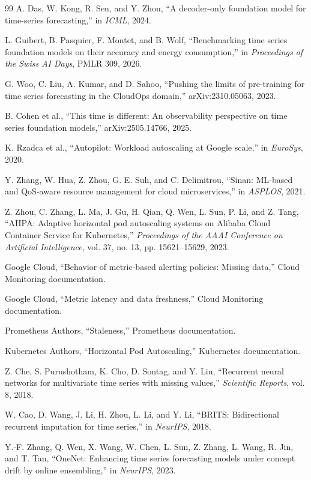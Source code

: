 \documentclass[conference]{IEEEtran}
\begin{document}
\begin{thebibliography}{99}
A. Das, W. Kong, R. Sen, and Y. Zhou, ``A decoder-only foundation model for time-series forecasting,'' in \emph{ICML}, 2024.

L. Guibert, B. Pasquier, F. Montet, and B. Wolf, ``Benchmarking time series foundation models on their accuracy and energy consumption,'' in \emph{Proceedings of the Swiss AI Days}, PMLR 309, 2026.

G. Woo, C. Liu, A. Kumar, and D. Sahoo, ``Pushing the limits of pre-training for time series forecasting in the CloudOps domain,'' arXiv:2310.05063, 2023.

B. Cohen et al., ``This time is different: An observability perspective on time series foundation models,'' arXiv:2505.14766, 2025.

K. Rzadca et al., ``Autopilot: Workload autoscaling at Google scale,'' in \emph{EuroSys}, 2020.

Y. Zhang, W. Hua, Z. Zhou, G. E. Suh, and C. Delimitrou, ``Sinan: ML-based and QoS-aware resource management for cloud microservices,'' in \emph{ASPLOS}, 2021.

Z. Zhou, C. Zhang, L. Ma, J. Gu, H. Qian, Q. Wen, L. Sun, P. Li, and Z. Tang, ``AHPA: Adaptive horizontal pod autoscaling systems on Alibaba Cloud Container Service for Kubernetes,'' \emph{Proceedings of the AAAI Conference on Artificial Intelligence}, vol. 37, no. 13, pp. 15621--15629, 2023.

Google Cloud, ``Behavior of metric-based alerting policies: Missing data,'' Cloud Monitoring documentation.

Google Cloud, ``Metric latency and data freshness,'' Cloud Monitoring documentation.

Prometheus Authors, ``Staleness,'' Prometheus documentation.

Kubernetes Authors, ``Horizontal Pod Autoscaling,'' Kubernetes documentation.

Z. Che, S. Purushotham, K. Cho, D. Sontag, and Y. Liu, ``Recurrent neural networks for multivariate time series with missing values,'' \emph{Scientific Reports}, vol. 8, 2018.

W. Cao, D. Wang, J. Li, H. Zhou, L. Li, and Y. Li, ``BRITS: Bidirectional recurrent imputation for time series,'' in \emph{NeurIPS}, 2018.

Y.-F. Zhang, Q. Wen, X. Wang, W. Chen, L. Sun, Z. Zhang, L. Wang, R. Jin, and T. Tan, ``OneNet: Enhancing time series forecasting models under concept drift by online ensembling,'' in \emph{NeurIPS}, 2023.


\end{thebibliography}
\end{document}
